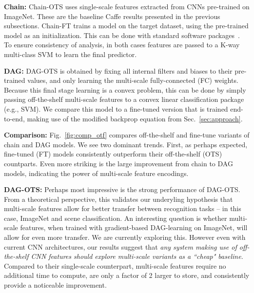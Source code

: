 \documentclass[10pt,twocolumn,letterpaper]{article}
\begin{document}
{\bf Chain:} Chain-OTS uses single-scale features extracted from CNNs pre-trained on ImageNet. These are the baseline Caffe results presented in the previous subsections. Chain-FT trains a model on the target dataset, using the pre-trained model as an initialization. This can be done with standard software packages~\cite{vedaldimatconvnet}. To ensure consistency of analysis, in both cases features are passed to a K-way multi-class SVM to learn the final predictor. %

{\bf DAG:} DAG-OTS is obtained by fixing all internal filters and biases to their pre-trained values, and only learning the multi-scale fully-connected (FC) weights. Because this final stage learning is a convex problem, this can be done by simply passing off-the-shelf multi-scale features to a convex linear classification package (e.g., SVM). We compare this model to a fine-tuned version that is trained end-to-end, making use of the modified backprop equation from Sec.~\ref{sec:approach}. %

{\bf Comparison:} Fig.~\ref{fig:comp_otf} compares off-the-shelf and fine-tune variants of chain and DAG models. We see two dominant trends. First, as perhaps expected, fine-tuned (FT) models consistently outperform their off-the-shelf (OTS) countparts. Even more striking is the large improvement from chain to DAG models, indicating the power of multi-scale feature encodings.

{\bf DAG-OTS:} Perhaps most impressive is the strong performance of DAG-OTS. From a theoretical perspective, this validates our underyling hypothesis that multi-scale features allow for better transfer between recognition tasks -- in this case, ImageNet and scene classification. An interesting question is whether multi-scale features, when trained with gradient-based DAG-learning on ImageNet, will allow for even more transfer. We are currently exploring this. However even with current CNN architectures, our results suggest that {\em any system making use of off-the-shelf CNN features should explore multi-scale variants as a ``cheap" baseline.}  Compared to their single-scale counterpart, multi-scale features require no additional time to compute, are only a factor of 2 larger to store, and consistently provide a noticeable improvement.
\end{document}
